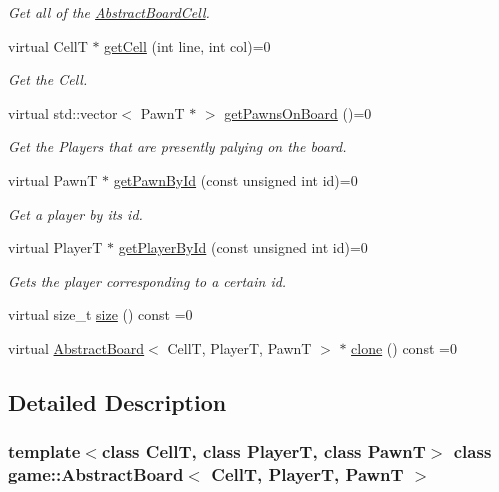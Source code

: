 \begin{DoxyCompactItemize}
\begin{DoxyCompactList}\small\item\em Get all of the \hyperlink{classgame_1_1_abstract_board_cell}{Abstract\+Board\+Cell}. \end{DoxyCompactList}\item 
virtual CellT $\ast$ \hyperlink{classgame_1_1_abstract_board_af02030d0ae3f44b95fff7c8012e7a066}{get\+Cell} (int line, int col)=0
\begin{DoxyCompactList}\small\item\em Get the Cell. \end{DoxyCompactList}\item 
virtual std\+::vector$<$ PawnT $\ast$ $>$ \hyperlink{classgame_1_1_abstract_board_a9c8a033b23ade01ecce24e95723ffd35}{get\+Pawns\+On\+Board} ()=0
\begin{DoxyCompactList}\small\item\em Get the Players that are presently palying on the board. \end{DoxyCompactList}\item 
virtual PawnT $\ast$ \hyperlink{classgame_1_1_abstract_board_a5d80fa5f0809c746349fc1bab1d8999b}{get\+Pawn\+By\+Id} (const unsigned int id)=0
\begin{DoxyCompactList}\small\item\em Get a player by it\textquotesingle{}s id. \end{DoxyCompactList}\item 
virtual PlayerT $\ast$ \hyperlink{classgame_1_1_abstract_board_a2ae30faf6d02d6d9757020a7ed7932cc}{get\+Player\+By\+Id} (const unsigned int id)=0
\begin{DoxyCompactList}\small\item\em Gets the player corresponding to a certain id. \end{DoxyCompactList}\item 
virtual size\+\_\+t \hyperlink{classgame_1_1_abstract_board_a17bd6905ded76d0005437d288fe8ac21}{size} () const =0
\item 
virtual \hyperlink{classgame_1_1_abstract_board}{Abstract\+Board}$<$ CellT, PlayerT, PawnT $>$ $\ast$ \hyperlink{classgame_1_1_abstract_board_abd467b64fd2c0dfbc0ce87200afb3e9e}{clone} () const =0
\end{DoxyCompactItemize}


\subsection{Detailed Description}
\subsubsection*{template$<$class CellT, class PlayerT, class PawnT$>$\newline
class game\+::\+Abstract\+Board$<$ Cell\+T, Player\+T, Pawn\+T $>$}

